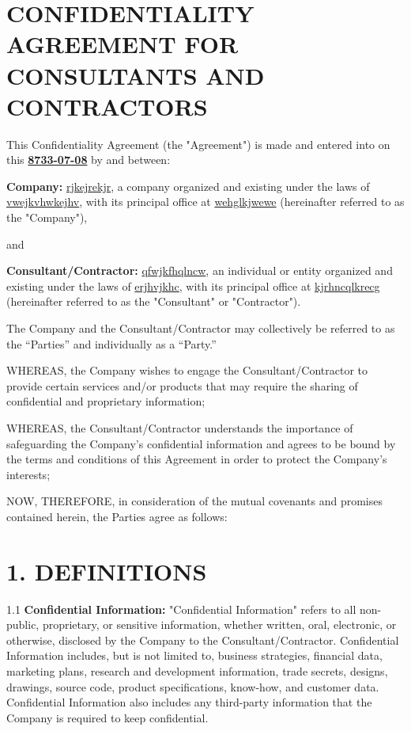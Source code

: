 \documentclass[12pt]{article}
\begin{document}
\section*{CONFIDENTIALITY AGREEMENT FOR CONSULTANTS AND CONTRACTORS}

This Confidentiality Agreement (the "Agreement") is made and entered into on this \textbf{\underline{8733-07-08}} by and between:

\textbf{Company:} \underline{rjkejrekjr}, a company organized and existing under the laws of \underline{vwejkvhwkejhv}, with its principal office at \underline{wehglkjwewe} (hereinafter referred to as the "Company"),

and

\textbf{Consultant/Contractor:} \underline{qfwjkfhqlncw}, an individual or entity organized and existing under the laws of \underline{erjhvjkhc}, with its principal office at \underline{kjrhncqlkrecg} (hereinafter referred to as the "Consultant" or "Contractor").

The Company and the Consultant/Contractor may collectively be referred to as the “Parties” and individually as a “Party.”

WHEREAS, the Company wishes to engage the Consultant/Contractor to provide certain services and/or products that may require the sharing of confidential and proprietary information;

WHEREAS, the Consultant/Contractor understands the importance of safeguarding the Company’s confidential information and agrees to be bound by the terms and conditions of this Agreement in order to protect the Company’s interests;

NOW, THEREFORE, in consideration of the mutual covenants and promises contained herein, the Parties agree as follows:

\section*{1. DEFINITIONS}

1.1 \textbf{Confidential Information:} "Confidential Information" refers to all non-public, proprietary, or sensitive information, whether written, oral, electronic, or otherwise, disclosed by the Company to the Consultant/Contractor. Confidential Information includes, but is not limited to, business strategies, financial data, marketing plans, research and development information, trade secrets, designs, drawings, source code, product specifications, know-how, and customer data. Confidential Information also includes any third-party information that the Company is required to keep confidential.
\end{document}
